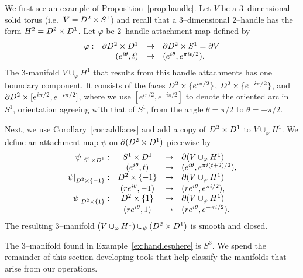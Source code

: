 \begin{ex}
	\label{ex:handlesphere}
	We first see an example of Proposition~\ref{prop:handle}.
	Let $V$ be a 3--dimensional solid torus (i.e.\ $V=D^2\times S^1$) and recall that a 3--dimensional 2--handle has the form $H^2=D^2\times D^1$.
	Let $\varphi$ be 2--handle attachment map defined by
	\[
		\begin{array}{rrcl}
			\varphi:	&	\partial D^2\times D^1	&	\to		&	\partial D^2\times S^1=\partial V	\\
						&	(e^{i\theta},t)		&	\mapsto	&	(e^{i\theta},e^{\pi it/2}).
		\end{array}
	\]
	The 3-manifold $V\cup_{\varphi}H^1$ that results from this handle attachments has one boundary component.
	It consists of the faces $D^2\times\{e^{i\pi/2}\}$, $D^2\times\{e^{-i\pi/2}\}$, and $\partial D^2\times[e^{i\pi/2},e^{-i\pi/2}]$, where we use $[e^{i\pi/2},e^{-i\pi/2}]$ to denote the oriented arc in $S^1$, orientation agreeing with that of $S^1$, from the angle $\theta=\pi/2$ to $\theta=-\pi/2$.
	
	Next, we use Corollary~\ref{cor:addfaces} and add a copy of $D^2\times D^1$ to $V\cup_{\varphi}H^1$.
	We define an attachment map $\psi$ on $\partial(D^2\times D^1)$ piecewise by
	\[
		\begin{array}{rccl}
			\left.\psi\right|_{S^1\times D^1}:
				&	S^1\times D^1
				&	\to	
				&	\partial (V\cup_\varphi H^1)			\\
			
				&	(e^{i\theta},t)
				&	\mapsto
				&	(e^{i\theta},e^{\pi i(t+2)/2}),	\\

			\left.\psi\right|_{D^2\times\{-1\}}:
				&	D^2\times\{-1\}
				&	\to	
				&	\partial (V\cup_\varphi H^1)			\\
				
				&	(re^{i\theta},-1)
				&	\mapsto
				&	(re^{i\theta},e^{\pi i/2}),		\\
				
			\left.\psi\right|_{D^2\times\{1\}}:
				&	D^2\times\{1\}
				&	\to	
				&	\partial (V\cup_\varphi H^1)			\\
				
				&	(re^{i\theta},1)
				&	\mapsto
				&	(re^{i\theta},e^{-\pi i/2}).
		\end{array}
	\]
	The resulting 3--manifold $(V\cup_\varphi H^1)\cup_\psi (D^2\times D^1)$ is smooth and closed.	
\end{ex}

The 3--manifold found in Example~\ref{ex:handlesphere} is $S^3$.
We spend the remainder of this section developing tools that help classify the manifolds that arise from our operations.

